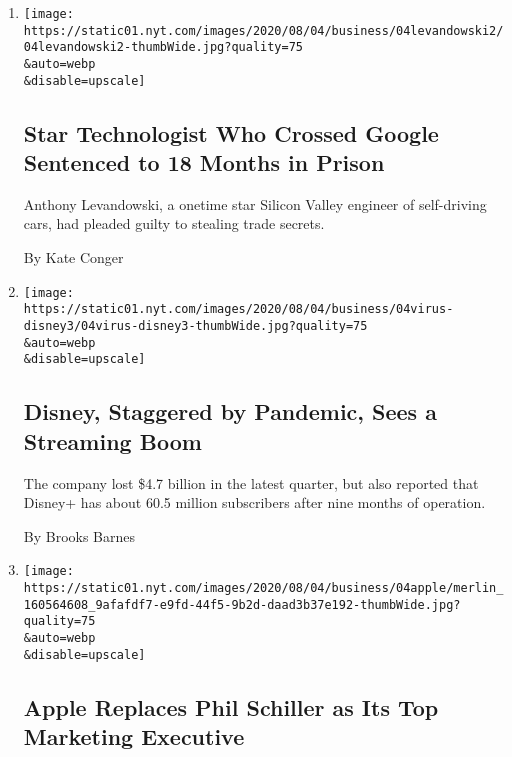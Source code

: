 \begin{enumerate}
\def\labelenumi{\arabic{enumi}.}
\item
  \href{/2020/08/04/technology/levandowski-google-uber-sentencing-trade-secrets.html}{}

  \texttt{[image: https://static01.nyt.com/images/2020/08/04/business/04levandowski2/04levandowski2-thumbWide.jpg?quality=75\\\&auto=webp\\\&disable=upscale]}

  \hypertarget{star-technologist-who-crossed-google-sentenced-to-18-months-in-prison}{%
  \subsection{Star Technologist Who Crossed Google Sentenced to 18
  Months in
  Prison}\label{star-technologist-who-crossed-google-sentenced-to-18-months-in-prison}}

  Anthony Levandowski, a onetime star Silicon Valley engineer of
  self-driving cars, had pleaded guilty to stealing trade secrets.

  By Kate Conger
\item
  \href{/2020/08/04/business/media/disney-earnings-coronavirus.html}{}

  \texttt{[image: https://static01.nyt.com/images/2020/08/04/business/04virus-disney3/04virus-disney3-thumbWide.jpg?quality=75\\\&auto=webp\\\&disable=upscale]}

  \hypertarget{disney-staggered-by-pandemic-sees-a-streaming-boom}{%
  \subsection{Disney, Staggered by Pandemic, Sees a Streaming
  Boom}\label{disney-staggered-by-pandemic-sees-a-streaming-boom}}

  The company lost \$4.7 billion in the latest quarter, but also
  reported that Disney+ has about 60.5 million subscribers after nine
  months of operation.

  By Brooks Barnes
\item
  \href{/2020/08/04/technology/apple-schiller-marketing-executive-departure.html}{}

  \texttt{[image: https://static01.nyt.com/images/2020/08/04/business/04apple/merlin\_160564608\_9afafdf7-e9fd-44f5-9b2d-daad3b37e192-thumbWide.jpg?quality=75\\\&auto=webp\\\&disable=upscale]}

  \hypertarget{apple-replaces-phil-schiller-as-its-top-marketing-executive}{%
  \subsection{Apple Replaces Phil Schiller as Its Top Marketing
  Executive}\label{apple-replaces-phil-schiller-as-its-top-marketing-executive}}


\end{enumerate}
